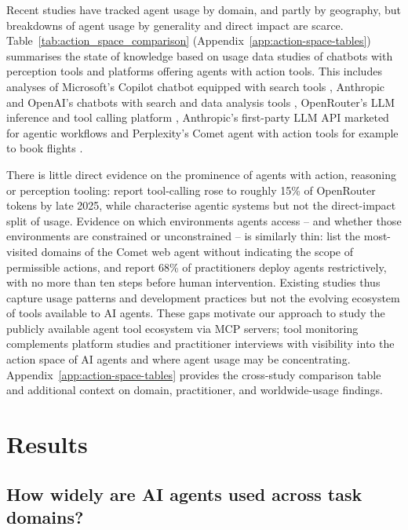 \documentclass[manuscript,screen,nonacm,oneside]{acmart}
\begin{document}
Recent studies have tracked agent usage by domain, and partly by geography, but breakdowns of agent usage by generality and direct impact are scarce. Table~\ref{tab:action_space_comparison} (Appendix~\ref{app:action-space-tables}) summarises the state of knowledge based on usage data studies of chatbots with perception tools and platforms offering agents with action tools. This includes analyses of Microsoft's Copilot chatbot equipped with search tools \citep{yang2025adoption}, Anthropic and OpenAI's chatbots with search and data analysis tools \citep{handa2025which} \citep{chatterji2025people}, OpenRouter's LLM inference and tool calling platform \citep{aubakirova2025state}, Anthropic's first-party LLM API marketed for agentic workflows \citep{handa2025which} and Perplexity's Comet agent with action tools for example to book flights \citep{yang2025adoption}.

There is little direct evidence on the prominence of agents with action, reasoning or perception tooling: \citep{aubakirova2025state} report tool-calling rose to roughly 15\% of OpenRouter tokens by late 2025, while \citep{kasirzadeh2025characterizing,staufer20262025aiagentindex,casper2025agent} characterise agentic systems but not the direct-impact split of usage. Evidence on which environments agents access -- and whether those environments are constrained or unconstrained -- is similarly thin: \citep{yang2025adoption} list the most-visited domains of the Comet web agent without indicating the scope of permissible actions, and \citep{pan2025measuring} report 68\% of practitioners deploy agents restrictively, with no more than ten steps before human intervention. Existing studies thus capture usage patterns and development practices but not the evolving ecosystem of tools available to AI agents. These gaps motivate our approach to study the publicly available agent tool ecosystem via MCP servers; tool monitoring complements platform studies and practitioner interviews with visibility into the action space of AI agents and where agent usage may be concentrating. Appendix~\ref{app:action-space-tables} provides the cross-study comparison table and additional context on domain, practitioner, and worldwide-usage findings.

\section{Results}
\label{sec:results}
\subsection{How widely are AI agents used across task domains?}
\label{sec:res-task-domains}
\end{document}
